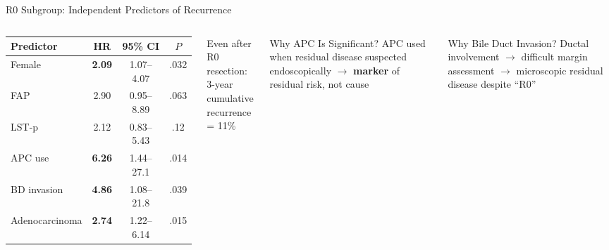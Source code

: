\documentclass[aspectratio=169,10pt]{beamer}
\newcommand{\pos}[1]{\textcolor{positive}{#1}}
\renewcommand{\neg}[1]{\textcolor{negative}{#1}}
\begin{document}
\begin{frame}{R0 Subgroup: Independent Predictors of Recurrence}
\begin{columns}[T]
\small
\begin{tabular}{@{}lccc@{}}
\toprule
\textbf{Predictor} & \textbf{HR} & \textbf{95\% CI} & \textbf{$P$} \\
\midrule
Female & \textbf{2.09} & 1.07--4.07 & \pos{.032} \\
FAP & 2.90 & 0.95--8.89 & .063 \\
LST-p & 2.12 & 0.83--5.43 & .12 \\
APC use & \textbf{6.26} & 1.44--27.1 & \pos{.014} \\
BD invasion & \textbf{4.86} & 1.08--21.8 & \pos{.039} \\
Adenocarcinoma & \textbf{2.74} & 1.22--6.14 & \pos{.015} \\
\bottomrule
\end{tabular}

\vspace{6pt}
Even after R0 resection:\\
3-year cumulative recurrence = \neg{11\%}

\begin{alertblock}{Why APC Is Significant?}
  APC used when residual disease suspected endoscopically $\to$ \textbf{marker} of residual risk, not cause
\end{alertblock}

\vspace{4pt}
\begin{exampleblock}{Why Bile Duct Invasion?}
  Ductal involvement $\to$ difficult margin assessment $\to$ microscopic residual disease despite ``R0''
\end{exampleblock}
\end{columns}
\end{frame}
\end{document}
